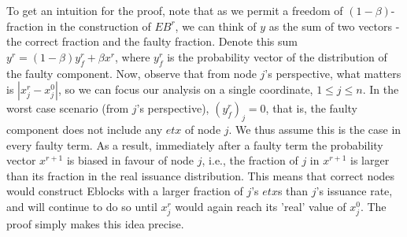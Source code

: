 To get an intuition for the proof, note that as we permit a freedom of $(1-\beta)$-fraction in the construction of $EB^r$, we can think of $y$ as the sum of two vectors - the correct fraction and the faulty fraction. Denote this sum $y^r=(1-\beta)y^r_f+\beta x^r$, where $y^r_f$ is the probability vector of the distribution of the faulty component. Now, observe that from node $j$'s perspective, what matters is $|x_j^r-x_j^0|$, so we can focus our analysis on a single coordinate, $1\leq j\leq n$. In the worst case scenario (from $j$'s perspective), $(y_f^r)_j=0$, that is, the faulty component does not include any $etx$ of node $j$. We thus assume this is the case in every faulty term. As a result, immediately after a faulty term the probability vector $x^{r+1}$ is biased in favour of node $j$, i.e., the fraction of $j$ in $x^{r+1}$ is larger than its fraction in the real issuance distribution. This means that correct nodes would construct Eblocks with a larger fraction of $j$'s $etx$s than $j$'s issuance rate, and will continue to do so until $x^r_j$ would again reach its 'real' value of $x^0_j$. The proof simply makes this idea precise. 

